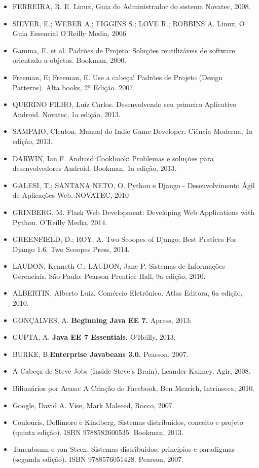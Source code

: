 \begin{itemize}
    \item FERREIRA, R. E.
          Linux, Guia do Administrador do sistema
          Novatec, 2008.
    
    \item SIEVER, E.; WEBER A.; FIGGINS S.; LOVE R.; ROBBINS A.
          Linux, O Guia Essencial
          O'Reilly Media, 2006
	\item Gamma, E. et al. Padrões de Projeto: Soluções reutilizáveis de software orientado a objetos. Bookman, 2000.
	\item Freeman, E; Freeman, E. Use a cabeça! Padrões de Projeto (Design Patterns). Alta books, 2ª Edição. 2007.
    \item QUERINO FILHO, Luiz Carlos.
          Desenvolvendo seu primeiro Aplicativo Android.
          Novatec, 1a edição, 2013.

    \item SAMPAIO, Cleuton.
          Manual do Indie Game Developer.
          Ciência Moderna, 1a edição, 2013.

    \item DARWIN, Ian F.
          Android Cookbook: Problemas e soluções para desenvolvedores Android.
          Bookman, 1a edição, 2013.
    \item GALESI, T.; SANTANA NETO, O.
          Python e Django - Desenvolvimento Ágil de Aplicações Web.
          NOVATEC, 2010

    \item GRINBERG, M.
          Flask Web Development: Developing Web Applications with Python.
          O'Reilly Media, 2014.

    \item GREENFIELD, D.; ROY, A.
          Two Scoopes of Django: Best Pratices For Django 1.6.
          Two Scoopes Press, 2014.
    \item LAUDON, Kenneth C.; LAUDON, Jane P.
          Sistemas de Informações Gerenciais.
          São Paulo: Pearson Prentice Hall, 9a edição, 2010.

    \item ALBERTIN, Alberto Luiz.
          Comércio Eletrônico.
          Atlas Editora, 6a edição, 2010.
	\item 	GONÇALVES, A. \textbf{Beginning Java EE 7.} Apress, 2013;
	\item 	GUPTA, A. \textbf{Java EE 7 Essentials.} O’Reilly, 2013;
	\item 	BURKE, B.\textbf{Enterprise Javabeans 3.0.} Pearson, 2007.
	\item A Cabeça de Steve Jobs (Inside Steve's Brain), Leander Kahney, Agir, 2008.
	\item Bilionários por Acaso: A Criação do Facebook, Ben Mezrich, Intrinseca, 2010.
	\item Google, David A. Vise, Mark Malseed, Rocco, 2007.
	\item Coulouris, Dollimore e Kindberg, Sistemas distribuídos, conceito e projeto (quinta edição). ISBN 9788582600535. Bookman, 2013.
	\item Tanenbaum e van Steen, Sistemas distribuídos, princípios e paradigmas (segunda edição). ISBN 9788576051428. Pearson, 2007.
\end{itemize}

